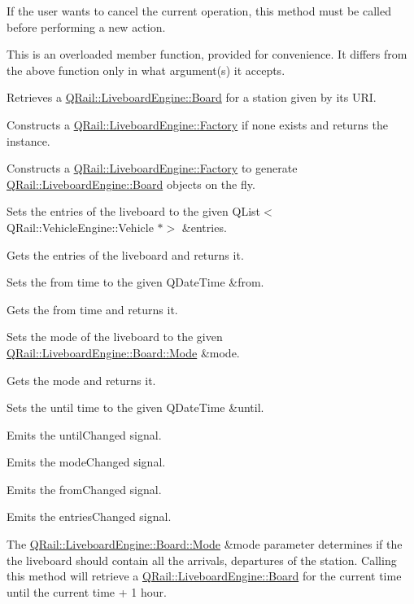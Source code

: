 If the user wants to cancel the current operation, this method must be called before performing a new action.

This is an overloaded member function, provided for convenience. It differs from the above function only in what argument(s) it accepts.

Retrieves a \mbox{\hyperlink{classQRail_1_1LiveboardEngine_1_1Board}{Q\+Rail\+::\+Liveboard\+Engine\+::\+Board}} for a station given by it\textquotesingle{}s U\+RI.

Constructs a \mbox{\hyperlink{classQRail_1_1LiveboardEngine_1_1Factory}{Q\+Rail\+::\+Liveboard\+Engine\+::\+Factory}} if none exists and returns the instance.

Constructs a \mbox{\hyperlink{classQRail_1_1LiveboardEngine_1_1Factory}{Q\+Rail\+::\+Liveboard\+Engine\+::\+Factory}} to generate \mbox{\hyperlink{classQRail_1_1LiveboardEngine_1_1Board}{Q\+Rail\+::\+Liveboard\+Engine\+::\+Board}} objects on the fly.

Sets the entries of the liveboard to the given Q\+List$<$\+Q\+Rail\+::\+Vehicle\+Engine\+::\+Vehicle $\ast$$>$ \&entries.

Gets the entries of the liveboard and returns it.

Sets the from time to the given Q\+Date\+Time \&from.

Gets the from time and returns it.

Sets the mode of the liveboard to the given \mbox{\hyperlink{classQRail_1_1LiveboardEngine_1_1Board_a0ab6d318f405895f62c6e98cb2d86c6e}{Q\+Rail\+::\+Liveboard\+Engine\+::\+Board\+::\+Mode}} \&mode.

Gets the mode and returns it.

Sets the until time to the given Q\+Date\+Time \&until.

Emits the until\+Changed signal.

Emits the mode\+Changed signal.

Emits the from\+Changed signal.

Emits the entries\+Changed signal.

The \mbox{\hyperlink{classQRail_1_1LiveboardEngine_1_1Board_a0ab6d318f405895f62c6e98cb2d86c6e}{Q\+Rail\+::\+Liveboard\+Engine\+::\+Board\+::\+Mode}} \&mode parameter determines if the the liveboard should contain all the arrivals, departures of the station. Calling this method will retrieve a \mbox{\hyperlink{classQRail_1_1LiveboardEngine_1_1Board}{Q\+Rail\+::\+Liveboard\+Engine\+::\+Board}} for the current time until the current time + 1 hour.

